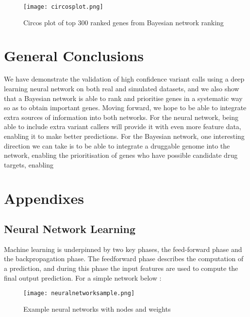 \documentclass{article}
\begin{document}
\begin{figure}[H]
\texttt{[image: circosplot.png]}
\caption{Circos plot of top 300 ranked genes from Bayesian network ranking}
\centering
\end{figure}

\newpage
\section{General Conclusions}
We have demonstrate the validation of high confidence variant calls using a deep learning neural network on both real and simulated datasets, and we also show that a Bayesian network is able to rank and prioritise genes in a systematic way so as to obtain important genes. Moving forward, we hope to be able to integrate extra sources of information into both networks. For the neural network, being able to include extra variant callers will provide it with even more feature data, enabling it to make better predictions. For the Bayesian network, one interesting direction we can take is to be able to integrate a druggable genome into the network, enabling the prioritisation of genes who have possible candidate drug targets, enabling 
\newpage
\section{Appendixes}

\subsection{Neural Network Learning}
Machine learning is underpinned by two key phases, the feed-forward phase and the backpropagation phase. The feedforward phase describes the computation of a prediction, and during this phase the input features are used to compute the final output prediction. For a simple network below :

\begin{figure}[H]
\texttt{[image: neuralnetworksample.png]}
\caption{Example neural networks with nodes and weights}
\centering
\end{figure}
\end{document}
